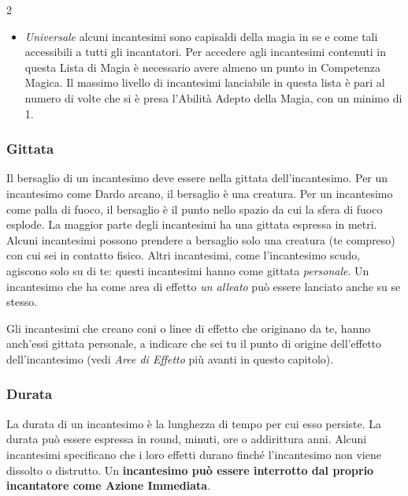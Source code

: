 \begin{multicols}{2}
\begin{itemize}[leftmargin=*]
\item
\emph{Universale} alcuni incantesimi sono capisaldi della magia in se e come tali accessibili a tutti gli incantatori. Per accedere agli incantesimi contenuti in questa Lista di Magia è necessario avere almeno un punto in Competenza Magica. Il massimo livello di incantesimi lanciabile in questa lista è pari al numero di volte che si è presa l'Abilità Adepto della Magia, con un minimo di 1.

\end{itemize}

\subsubsection{Gittata}\label{magiegittata}

Il bersaglio di un incantesimo deve essere nella gittata dell'incantesimo. Per un incantesimo come Dardo arcano, il bersaglio è una creatura. Per un incantesimo come palla di fuoco, il bersaglio è il punto nello spazio da cui la sfera di fuoco esplode. La maggior parte degli incantesimi ha una gittata espressa in metri. Alcuni incantesimi possono prendere a bersaglio solo una creatura (te compreso) con cui sei in contatto fisico. Altri incantesimi, come l'incantesimo scudo, agiscono solo su di te: questi incantesimi hanno come gittata \emph{personale}. Un incantesimo che ha come area di effetto \emph{un alleato} può essere lanciato anche su se stesso.

Gli incantesimi che creano coni o linee di effetto che originano da te, hanno anch'essi gittata personale, a indicare che sei tu il punto di origine dell'effetto dell'incantesimo (vedi \emph{Aree di Effetto} più avanti in questo capitolo).

\subsubsection{Durata}\label{magiedurata}\hypertarget{magiedurata}{}

La durata di un incantesimo è la lunghezza di tempo per cui esso persiste. La durata può essere espressa in round, minuti, ore o addirittura anni. Alcuni incantesimi specificano che i loro effetti durano finché l'incantesimo non viene dissolto o distrutto. Un \textbf{incantesimo può essere interrotto dal proprio incantatore come Azione Immediata}.


\end{multicols}
